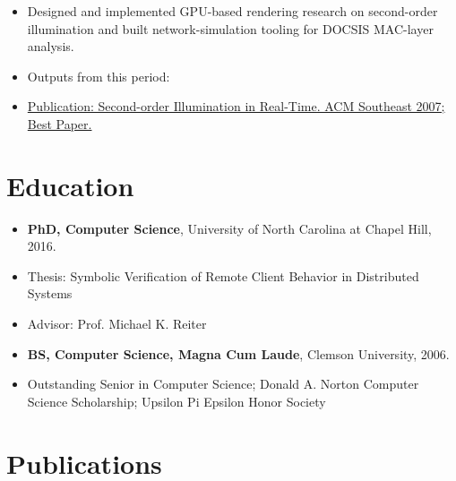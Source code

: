 \documentclass[10pt,letterpaper]{article}
\begin{document}
\begin{itemize}

  \item Designed and implemented GPU-based rendering research on second-order illumination and built network-simulation tooling for DOCSIS MAC-layer analysis.

  \item Outputs from this period:

  \item \href{https://www.robbycochran.com/pdf/ACMSE07.pdf}{Publication: Second-order Illumination in Real-Time. ACM Southeast 2007; Best Paper.}

\end{itemize}

\section*{Education}

\begin{itemize}

  \item \textbf{PhD, Computer Science}, University of North Carolina at Chapel Hill, 2016.

  \item Thesis: Symbolic Verification of Remote Client Behavior in Distributed Systems

  \item Advisor: Prof. Michael K. Reiter

  \item \textbf{BS, Computer Science, Magna Cum Laude}, Clemson University, 2006.

  \item Outstanding Senior in Computer Science; Donald A. Norton Computer Science Scholarship; Upsilon Pi Epsilon Honor Society

\end{itemize}

\section*{Publications}
\end{document}
